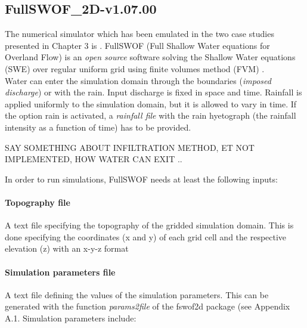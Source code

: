 \subsection{FullSWOF\_2D-v1.07.00}






The numerical simulator which has been emulated in the two case studies presented in Chapter 3 is . FullSWOF (Full Shallow Water equations for Overland Flow) is an \emph{open source} software solving the Shallow Water equations (SWE) over regular uniform grid using finite volumes method (FVM) %
\autocite{the_fullswof_team_fullswof_2018}. \\
 
Water can enter the simulation domain through the boundaries (\emph{imposed discharge}) or with the rain.
Input discharge is fixed in space and time. Rainfall is applied uniformly to the simulation domain, but it is allowed to vary in time. If the option rain is activated, a \emph{rainfall file} with the rain hyetograph (the rainfall intensity as a function of time) has to be provided.   

SAY SOMETHING ABOUT INFILTRATION METHOD, ET NOT IMPLEMENTED, HOW WATER CAN EXIT .. 

In order to run simulations, FullSWOF needs at least the following inputs:
\paragraph{Topography file} A text file specifying the topography of the gridded simulation domain. This is done specifying the coordinates (x and y) of each grid cell and the respective elevation (z) with an x-y-z format 

\paragraph{Simulation parameters file} A text file defining the values of the simulation parameters. This can be generated with the function \textit{params2file} of the fswof2d package (see Appendix A.1.
Simulation parameters include:

